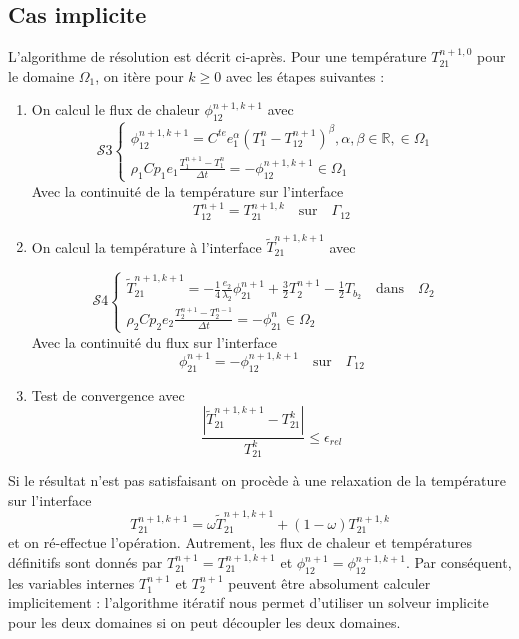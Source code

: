 \documentclass[11pt,a4paper]{scrartcl}%
\newcommand{\R}{\mathbb{R}}
\newcommand{\va}[1]{\left\lvert#1\right\rvert}%
\newcommand{\mtext}[1]{\quad\text{#1}\quad}%
\begin{document}
	\subsection{Cas implicite}
	L'algorithme de résolution est décrit ci-après. Pour une température $T_{21}^{n+1,0}$ pour le domaine $\Omega_1$, on itère pour $k\geq 0$ avec les étapes suivantes :
	\begin{enumerate}
		\item On calcul le flux de chaleur $\phi_{12}^{n+1,k+1}$ avec
		\begin{equation}
		\mathcal{S}3
		\begin{cases}
		\phi_{12}^{n+1,k+1} = C^{te}e_1^{\alpha}(T_1^n - T_{12}^{n+1})^{\beta}, \alpha, \beta \in\R, \in\Omega_1 & \\
		\rho_1C{p_1}e_1 \frac{T_1^{n+1} - T_1^{n}}{\Delta t} = -\phi_{12}^{n+1, k+1} \in\Omega_1
		\end{cases}
		\end{equation}
		Avec la continuité de la température sur l'interface
		\begin{equation}
		T_{12}^{n+1} = T_{21}^{n+1,k} \mtext{sur} \Gamma_{12}
		\end{equation}
		\item On calcul la température à l'interface $\tilde{T}_{21}^{n+1,k+1}$ avec
		
		\begin{equation}
		\mathcal{S}4
		\begin{cases}
		\tilde{T}_{21}^{n+1,k+1} = -\frac{1}{4}\frac{e_2}{\lambda_2}\phi_{21}^{n+1} + \frac{3}{2}T_{2}^{n+1} - \frac{1}{2}T_{b_2} \mtext{dans} \Omega_2 &\\
		\rho_2C{p_2}e_2 \frac{T_2^{n+1} - T_2^{n-1}}{\Delta t} = -\phi_{21}^n \in\Omega_2
		\end{cases}
		\end{equation}
		Avec la continuité du flux sur l'interface 
		\begin{equation}
		\phi_{21}^{n+1} = -\phi_{12}^{n+1,k+1} \mtext{sur} \Gamma_{12}
		\end{equation}
		\item Test de convergence avec 
		\begin{equation}
		\frac{\va{\tilde{T}_{21}^{n+1,k+1}-T_{21}^k}}{T_{21}^k} \leq \epsilon_{rel}
		\end{equation}
	\end{enumerate}
	Si le résultat n'est pas satisfaisant on procède à une relaxation de la température sur l'interface
	\begin{equation}\label{eq25}
	T_{21}^{n+1,k+1} = \omega\tilde{T}_{21}^{n+1, k+1} + (1-\omega)T_{21}^{n+1,k}
	\end{equation}
	et on ré-effectue l'opération. Autrement, les flux de chaleur et températures définitifs sont donnés par $T_{21}^{n+1} = T_{21}^{n+1,k+1}$ et $\phi_{12}^{n+1} = \phi_{12}^{n+1,k+1}$. Par conséquent, les variables internes $T_1^{n+1}$ et $T_2^{n+1}$ peuvent être absolument calculer implicitement : l'algorithme itératif nous permet d'utiliser un solveur implicite pour les deux domaines si on peut découpler les deux domaines.
\end{document}
